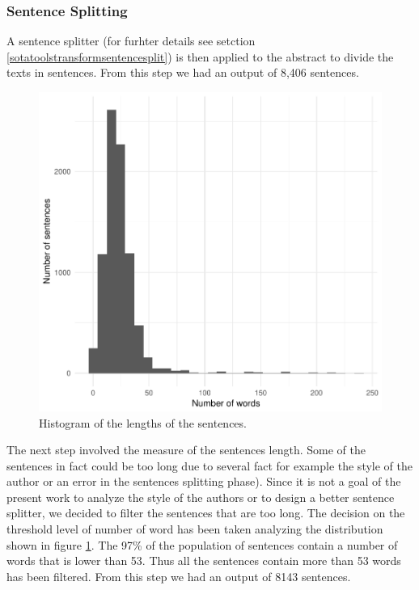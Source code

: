 \documentclass[]{book}
\begin{document}
\subsubsection*{Sentence Splitting}\label{sentence-splitting}

A sentence splitter (for furhter details see setction
\ref{sotatoolstransformsentencesplit}) is then applied to the abstract
to divide the texts in sentences. From this step we had an output of
8,406 sentences.

\begin{figure}

{\centering \includegraphics[width=0.8\linewidth]{_bookdown_files/figures/length_histogram_bl} 

}

\caption{Histogram of the lengths of the sentences.}\label{fig:histbllength}
\end{figure}

The next step involved the measure of the sentences length. Some of the
sentences in fact could be too long due to several fact for example the
style of the author or an error in the sentences splitting phase). Since
it is not a goal of the present work to analyze the style of the authors
or to design a better sentence splitter, we decided to filter the
sentences that are too long. The decision on the threshold level of
number of word has been taken analyzing the distribution shown in figure
\ref{fig:histbllength}. The 97\% of the population of sentences contain
a number of words that is lower than 53. Thus all the sentences contain
more than 53 words has been filtered. From this step we had an output of
8143 sentences.
\end{document}
